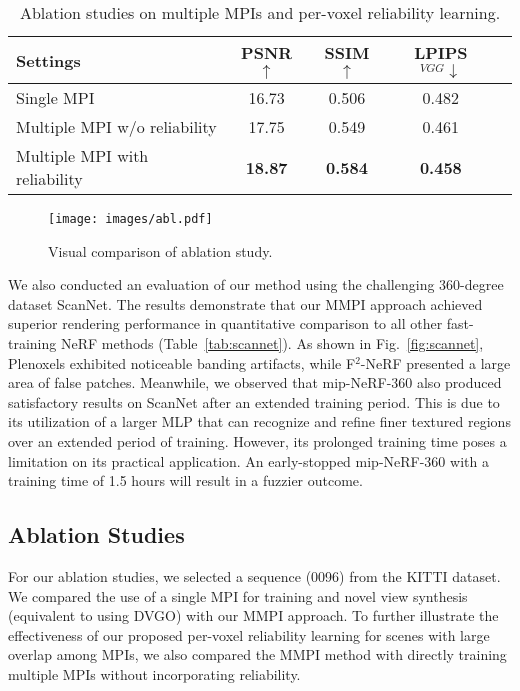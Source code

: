 \documentclass[letterpaper, 10 pt, conference]{ieeeconf}  %
\begin{document}
\begin{table}[t]
    \centering
    \caption{Ablation studies on multiple MPIs and per-voxel reliability learning.}
    \label{tab:ablation}
    \begin{tabular}{lcccc}
        \toprule
        Settings & PSNR$\uparrow$ & SSIM$\uparrow$ & LPIPS$_{VGG}\downarrow$ \\
        \midrule
        Single MPI                      & 16.73 & 0.506 & 0.482 \\
        Multiple MPI w/o reliability    & 17.75 & 0.549 & 0.461 \\
        Multiple MPI with reliability   & \textbf{18.87} & \textbf{0.584} & \textbf{0.458} \\
        \bottomrule
    \end{tabular}
\end{table}

\begin{figure}[t]
  \centering
  \texttt{[image: images/abl.pdf]}
  \caption{Visual comparison of ablation study.}
  \label{fig:abl}
\end{figure}

We also conducted an evaluation of our method using the challenging 360-degree dataset ScanNet. The results demonstrate that our MMPI approach achieved superior rendering performance in quantitative comparison to all other fast-training NeRF methods (Table~\ref{tab:scannet}). As shown in Fig.~\ref{fig:scannet}, Plenoxels exhibited noticeable banding artifacts, while F$^2$-NeRF presented a large area of false patches. Meanwhile, we observed that mip-NeRF-360 also produced satisfactory results on ScanNet after an extended training period. This is due to its utilization of a larger MLP that can recognize and refine finer textured regions over an extended period of training. However, its prolonged training time poses a limitation on its practical application. 
An early-stopped mip-NeRF-360 with a training time of 1.5 hours will result in a fuzzier outcome.





\subsection{Ablation Studies}

For our ablation studies, we selected a sequence (0096) from the KITTI dataset. We compared the use of a single MPI for training and novel view synthesis (equivalent to using DVGO) with our MMPI approach. To further illustrate the effectiveness of our proposed per-voxel reliability learning for scenes with large overlap among MPIs, we also compared the MMPI method with directly training multiple MPIs without incorporating reliability.
\end{document}
